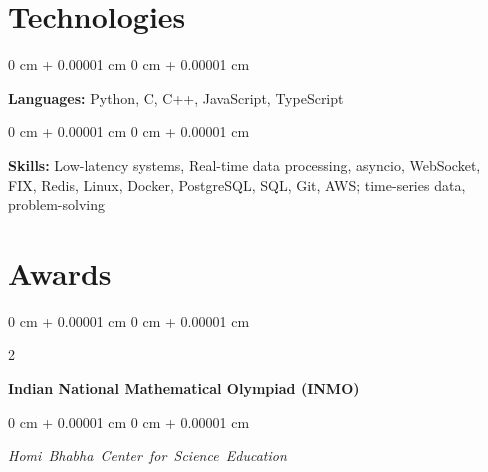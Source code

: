 \documentclass[10pt, letterpaper]{article}
\newenvironment{onecolentry}{
    \begin{adjustwidth}{
        0 cm + 0.00001 cm
    }{
        0 cm + 0.00001 cm
    }
}{
    \end{adjustwidth}
} %
\newenvironment{twocolentry}[2][]{
    \onecolentry
    \def\secondColumn{#2}
    \setcolumnwidth{\fill, 4.5 cm}
    \begin{paracol}{2}
}{
    \switchcolumn \raggedleft \secondColumn
    \end{paracol}
    \endonecolentry
} %
\begin{document}
    
    \section{Technologies}



        
        \begin{onecolentry}
            \textbf{Languages:} Python, C, C++, JavaScript, TypeScript
        \end{onecolentry}

        \vspace{0.2 cm}

        \begin{onecolentry}
            \textbf{Skills:} Low-latency systems, Real-time data processing, asyncio, WebSocket, FIX, Redis, Linux, Docker, PostgreSQL, SQL, Git, AWS; time-series data, problem-solving
        \end{onecolentry}



    
    \section{Awards}



        
        \begin{samepage}
            \begin{twocolentry}{
                2019
            }
                \textbf{Indian National Mathematical Olympiad (INMO)}
            \end{twocolentry}

            \vspace{0.10 cm}
            
            \begin{onecolentry}
                \mbox{\textit{Homi Bhabha Center for Science Education}}
                \vspace{0.10 cm}
                
            \end{onecolentry}
        \end{samepage}


    
\end{document}
